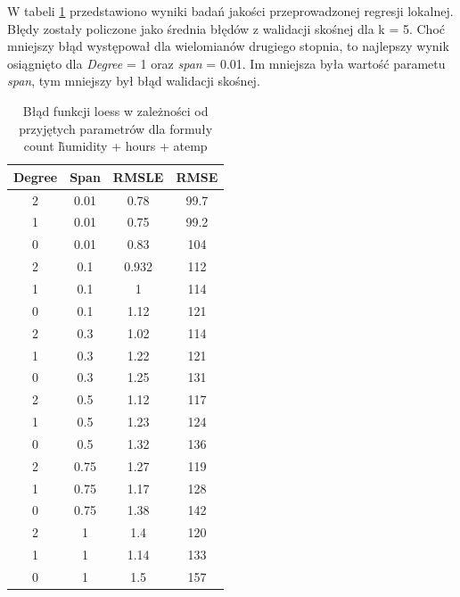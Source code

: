 \documentclass[a4paper,12pt]{article}
\begin{document}
        W tabeli \ref{tab:loess} przedstawiono wyniki badań jakości przeprowadzonej regresji lokalnej. Błędy zostały policzone jako średnia błędów z walidacji skośnej dla k = 5. Choć mniejszy błąd występował dla wielomianów drugiego stopnia, to najlepszy wynik osiągnięto dla \textit{Degree} = 1 oraz \textit{span} = 0.01. Im mniejsza była wartość parametu \textit{span}, tym mniejszy był błąd walidacji skośnej.
        
        
        \begin{table}[h]
        	\centering
            \begin{tabular}{|c|c|c|c|}
                \hline
                Degree & Span & RMSLE & RMSE \\
                \hline
                2 & 0.01 & 0.78
                & 99.7 \\
                \hline
                1 & 0.01 & 0.75 & 99.2 \\
                \hline
                0 & 0.01 & 0.83 & 104 \\
                \hline
                2 & 0.1 & 0.932 & 112 \\
                \hline
                1 & 0.1 & 1 & 114 \\
                \hline
                0 & 0.1 & 1.12 & 121 \\
                \hline
                2 & 0.3 & 1.02 & 114 \\
                \hline
                1 & 0.3 & 1.22 & 121 \\
                \hline
                0 & 0.3 & 1.25 & 131 \\
                \hline
                2 & 0.5 & 1.12 & 117 \\
                \hline
                1 & 0.5 & 1.23 & 124 \\
                \hline
                0 & 0.5 & 1.32 & 136 \\
                \hline
                2 & 0.75 & 1.27 & 119 \\
                \hline
                1 & 0.75 & 1.17 & 128 \\
                \hline
                0 & 0.75 & 1.38 & 142 \\
                \hline
                2 & 1 & 1.4 & 120 \\
                \hline
                1 & 1 & 1.14 & 133 \\
                \hline
                0 & 1 & 1.5 & 157 \\
                \hline
            \end{tabular}
            \caption{Błąd funkcji loess w zależności od przyjętych parametrów dla formuły count \~ humidity + hours + atemp}
            \label{tab:loess}
        \end{table}
        
\end{document}
